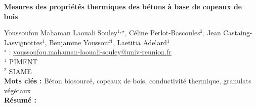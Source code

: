


    \newpage

\BgThispage

%
\begin{flushleft}
\addtocounter{section}{1}
{\Large \textbf{Mesures des propriétés thermiques des bétons à base de copeaux de bois}}\label{ref:20}
\end{flushleft}
%
Youssoufou Mahaman Laouali Souley$^{1,\star}$, Céline Perlot-Bascoules$^{2}$, Jean Castaing-Lasvignottes$^{1}$, Benjamine Youssouf$^{1}$, Laetitia Adelard$^{1}$\\[2mm]
$^{\star}$ \Letter : \url{youssoufou.mahaman-laouali-souley@univ-reunion.fr}\\[2mm]
{\footnotesize $^{1}$ PIMENT}\\
{\footnotesize $^{2}$ SIAME}\\
[4mm]
%
\noindent \textbf{Mots clés : } Béton biosourcé, copeaux de bois, conductivité thermique, granulats végétaux\\[4mm]
%
\noindent \textbf{Résumé : } 

